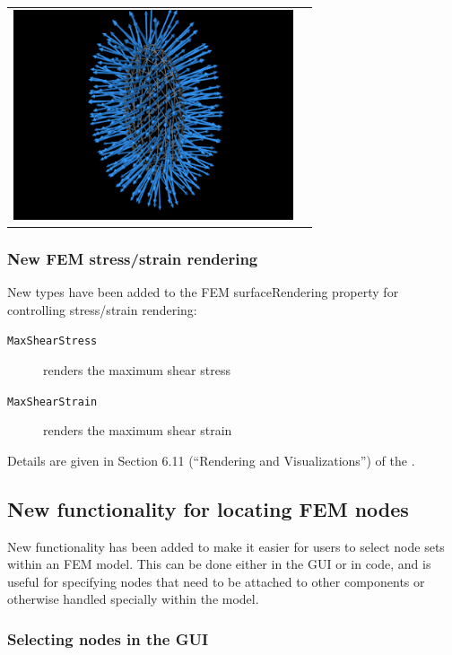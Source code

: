 \documentclass{article}
\begin{document}
\begin{center}
\begin{tabular}{cc}
 \includegraphics[width=3.25in]{../modelguide/images/VectorFaceFieldDemo}
\fi
\end{tabular}
\end{center}

\subsubsection{New FEM stress/strain rendering}

New types have been added to the FEM {\sf surfaceRendering} property
for controlling stress/strain rendering:

\begin{description}

\item[{\tt MaxShearStress}]\mbox{}

renders the maximum shear stress

\item[{\tt MaxShearStrain}]\mbox{}

renders the maximum shear strain

\end{description}

Details are given in Section 6.11 (``Rendering and Visualizations'')
of the .

\subsection*{New functionality for locating FEM nodes}

New functionality has been added to make it easier for users to select
node sets within an FEM model. This can be done either in the GUI or
in code, and is useful for specifying nodes that need to be attached
to other components or otherwise handled specially within the
model.

\subsubsection{Selecting nodes in the GUI}
\end{document}
